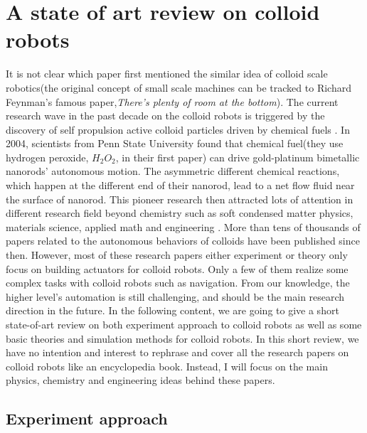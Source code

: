 \section{A state of art review on colloid robots }
It is not clear which paper first mentioned the similar idea of colloid scale robotics(the original concept of  small scale machines can be tracked to Richard Feynman's famous paper,\textit{There's plenty of room at the bottom}\cite{feynman1960there}). The current research wave in the past decade on the colloid robots is triggered by the discovery of self propulsion active colloid particles driven by chemical fuels \cite{paxton2004catalytic}. In 2004, scientists from Penn State University found that chemical fuel(they use hydrogen peroxide, $H_2O_2$,  in their first paper) can drive  gold-platinum bimetallic nanorods' autonomous motion. The asymmetric different chemical reactions, which happen at the different end of their nanorod,  lead to a net flow fluid near the surface of nanorod. This pioneer research then attracted lots of attention in different research field beyond chemistry such as soft condensed matter physics\cite{Marchetti2013}, materials science\cite{han2018engineering}, applied math\cite{fodor2016far} and engineering \cite{sitti2015biomedical}. More than tens of thousands of papers related to the autonomous behaviors of colloids have been published since then. However, most of these research papers either experiment or theory only focus on building actuators for colloid robots. Only a few of them realize some complex tasks with colloid robots such as navigation. From our knowledge, the higher level's automation is still challenging, and should be the main research direction in the future. In the following content, we are going to give a short state-of-art review on both experiment approach to colloid robots as well as some basic theories and simulation methods for colloid robots. In this short review, we have no intention and interest to rephrase and cover all the research papers on colloid robots like an encyclopedia book. Instead,  I will focus on the main physics, chemistry and engineering ideas behind these papers. 

\subsection{Experiment approach}

